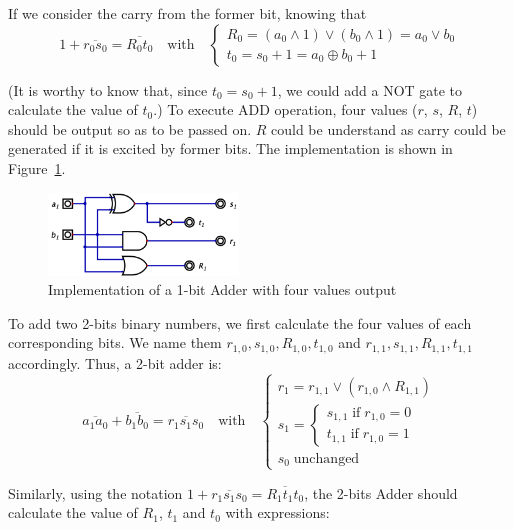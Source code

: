 \documentclass[conference]{IEEEtran}
\begin{document}
If we consider the carry from the former bit, knowing that 
\begin{equation}
    1 + \overline{r_0 s_0} = \overline{R_0 t_0} \quad \text{with} \quad \begin{cases}
        R_0 = (a_0 \wedge 1) \vee (b_0 \wedge 1) = a_0 \vee b_0  \\
        t_0 = s_0 + 1 = a_0 \oplus b_0 + 1
    \end{cases}
\end{equation}

(It is worthy to know that, since $t_0 = s_0 + 1$, we could add a NOT gate to calculate the value of $t_0$.)
To execute ADD operation, four values ($r$, $s$, $R$, $t$) should be output so as to be passed on. $R$ could be understand as carry could be generated if it is excited by former bits.
The implementation is shown in Figure~\ref{fig:1bit_adder}.

\begin{figure}[h!]
\centering
\includegraphics[width=0.45\textwidth]{assets/1bit_adder.png}
\caption{Implementation of a 1-bit Adder with four values output}
\label{fig:1bit_adder}
\end{figure}

To add two 2-bits binary numbers, we first calculate the four values of each corresponding bits. We name them $r_{1,0}, s_{1,0}, R_{1, 0}, t_{1,0}$ and $r_{1, 1}, s_{1, 1}, R_{1, 1}, t_{1, 1}$ accordingly.
Thus, a 2-bit adder is:
\begin{equation}
    \overline{a_1 a_0} + \overline{b_1 b_0} = \overline{r_1 s_1 s_0} \quad \text{with} \quad \begin{cases}
        r_1 = r_{1,1} \vee (r_{1,0} \wedge R_{1,1}) \\
        s_1 = \begin{cases}
        s_{1, 1} \; \text{if} \; r_{1, 0} = 0 \\
        t_{1, 1} \; \text{if} \; r_{1, 0} = 1
        \end{cases} \\
        s_0 \; \text{unchanged}
    \end{cases}
\end{equation}

Similarly, using the notation $1 + \overline{r_1 s_1 s_0} = \overline{R_1 t_1 t_0}$, the 2-bits Adder should calculate the value of $R_1$, $t_1$ and $t_0$ with expressions:
\end{document}
